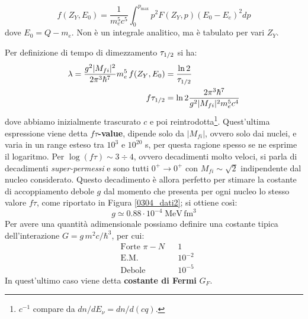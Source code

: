 \begin{definition}
$$f(Z_Y,E_0) = \frac{1}{m_e^5 c^5}\int_0^{p_{\max{}}} p^2 F(Z_Y,p)(E_0-E_e)^2 dp$$
dove $E_0= Q- m_e$. Non è un integrale analitico, ma è tabulato per vari $Z_Y$.
\end{definition}
\noindent Per definizione di tempo di dimezzamento $\tau_{1/2}$ si ha:
\begin{displaymath}
\begin{aligned}
\lambda = \frac{g^2 |M_{fi}|^2}{2\pi^3 \hbar^7} m_e^5\, f(Z_Y,E_0) &= \frac{\ln{2}}{\tau_{1/2}} \\
f\tau_{1/2} &= \ln{2}\frac{2\pi^3 \hbar^7}{ g^2 |M_{fi}|^2 m_e^5 c^4} 
\end{aligned}
\end{displaymath}
dove abbiamo inizialmente trascurato $c$ e poi reintrodotta\footnote{$c^{-1}$ compare da $dn/dE_\nu = dn/d(cq)$.}. Quest'ultima espressione viene detta $f\tau$\textbf{-value}, dipende solo da $|M_{fi}|$, ovvero solo dai nuclei, e varia in un range esteso tra $10^3$ e $10^{20}$ s, per questa ragione spesso se ne esprime il logaritmo. Per $\log{(f\tau)}\sim 3 \div 4$, ovvero decadimenti molto veloci, si parla di decadimenti \textit{super-permessi} e sono tutti $0^+\to0^+$ con $M_{fi}\sim \sqrt{2}$ indipendente dal nucleo considerato. Questo decadimento è allora perfetto per stimare la costante di accoppiamento debole $g$ dal momento che presenta per ogni nucleo lo stesso valore $f\tau$, come riportato in Figura \ref{0304_dati2}; si ottiene così:
$$g\simeq 0.88\cdot 10^{-4} \;\mbox{MeV}\,\mbox{fm}^3$$
Per avere una quantità adimensionale possiamo definire una costante tipica dell'interazione $G = g \,m^2c/\hbar^3$, per cui:
\begin{displaymath}
\begin{aligned}
&\text{Forte } \pi-N & &1 \\
&\text{E.M. } & &10^{-2} \\
&\text{Debole } & &10^{-5} 
\end{aligned}
\end{displaymath}
In quest'ultimo caso viene detta \textbf{costante di Fermi} $G_F$.

